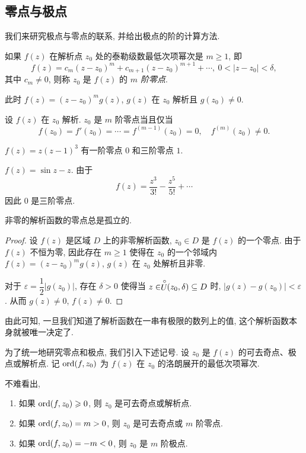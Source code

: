 \subsection{零点与极点}

我们来研究极点与零点的联系, 并给出极点的阶的计算方法.
\begin{definition}
	如果 $f(z)$ 在解析点 $z_0$ 处的泰勒级数最低次项幂次是 $m\ge1$, 即
	\[f(z)=c_m(z-z_0)^m+c_{m+1}(z-z_0)^{m+1}+\cdots,\ 0<|z-z_0|<\delta,\]
	其中 $c_m\neq 0$, 则称 $z_0$ 是 $f(z)$ 的 \emph{$m$ 阶零点}.
\end{definition}

此时 $f(z)=(z-z_0)^mg(z)$, $g(z)$ 在 $z_0$ 解析且 $g(z_0)\neq 0$.

\begin{theorem}
	设 $f(z)$ 在 $z_0$ 解析.
	$z_0$ 是 $m$ 阶零点当且仅当
	\[f(z_0)=f'(z_0)=\cdots=f^{(m-1)}(z_0)=0,\quad
	f^{(m)}(z_0)\neq 0.\]
\end{theorem}

\begin{example}
		$f(z)=z(z-1)^3$
	{有一阶零点 $0$ 和三阶零点 $1$.
	}
\end{example}

\begin{example}
		$f(z)=\sin z-z$.
	{由于
		\[f(z)=\frac{z^3}{3!}-\frac{z^5}{5!}+\cdots\]
		因此 $0$ 是三阶零点.
	}
\end{example}

\begin{theorem}\label{thm:zero-isolated}
非零的解析函数的零点总是孤立的.
\end{theorem}

\begin{proof}
	设 $f(z)$ 是区域 $D$ 上的非零解析函数, $z_0\in D$ 是 $f(z)$ 的一个零点.
	由于 $f(z)$ 不恒为零, 因此存在 $m\ge 1$ 使得在 $z_0$ 的一个邻域内 $f(z)=(z-z_0)^m g(z)$, $g(z)$ 在 $z_0$ 处解析且非零.
	
	对于 $\varepsilon=\dfrac12|g(z_0)|$, 存在 $\delta>0$ 使得当 $z\in \stackrel{\circ}{U}\!\!(z_0,\delta)\subseteq D$ 时, $|g(z)-g(z_0)|<\varepsilon$.
	从而 $g(z)\neq0$, $f(z)\neq 0$.
\end{proof}

由此可知, 一旦我们知道了解析函数在一串有极限的数列上的值, 这个解析函数本身就被唯一决定了.

为了统一地研究零点和极点, 我们引入下述记号.
设 $z_0$ 是 $f(z)$ 的可去奇点、极点或解析点.
记 ${\mathrm{ord}}(f,z_0)$ 为 $f(z)$ 在 $z_0$ 的洛朗展开的最低次项幂次.

不难看出,
\begin{enumerate}
	\item 如果 ${\mathrm{ord}}(f,z_0)\geqslant0$, 则 $z_0$ 是可去奇点或解析点.
	\item 如果 ${\mathrm{ord}}(f,z_0)=m>0$, 则 $z_0$ 是可去奇点或 $m$ 阶零点.
	\item 如果 ${\mathrm{ord}}(f,z_0)=-m<0$, 则 $z_0$ 是 $m$ 阶极点.
\end{enumerate}

